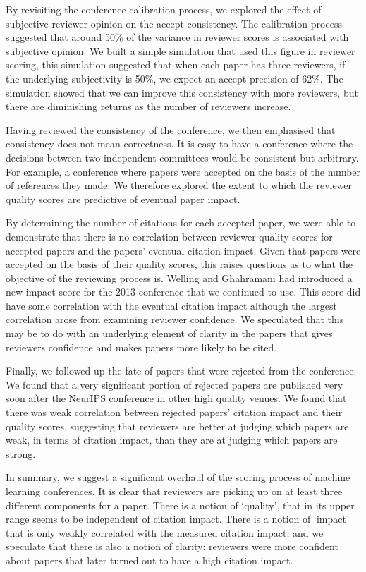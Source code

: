 \documentclass[twoside]{article}
\begin{document}
By revisiting the conference calibration process, we explored the
effect of subjective reviewer opinion on the accept consistency. The
calibration process suggested that around 50\% of the variance in
reviewer scores is associated with subjective opinion. We built a
simple simulation that used this figure in reviewer scoring, this
simulation suggested that when each paper has three reviewers, if the
underlying subjectivity is 50\%, we expect an accept precision of
62\%. The simulation showed that we can improve this consistency with
more reviewers, but there are diminishing returns as the number of
reviewers increase.

Having reviewed the consistency of the conference, we then emphasised
that consistency does not mean correctness. It is easy to have a
conference where the decisions between two independent committees
would be consistent but arbitrary. For example, a conference where papers
were accepted on the basis of the number of references they made. We
therefore explored the extent to which the reviewer quality scores are
predictive of eventual paper impact.

By determining the number of citations for each accepted paper, we
were able to demonstrate that there is no correlation between reviewer
quality scores for accepted papers and the papers' eventual citation
impact. Given that papers were accepted on the basis of their quality
scores, this raises questions as to what the objective of the
reviewing process is. Welling and Ghahramani had introduced a new
impact score for the 2013 conference that we
continued to use. This score did have some correlation with the
eventual citation impact although the largest correlation arose from
examining reviewer confidence. We speculated that this may be to do
with an underlying element of clarity in the papers that gives
reviewers confidence and makes papers more likely to be cited.

Finally, we followed up the fate of papers that were rejected from the
conference. We found that a very significant portion of rejected
papers are published very soon after the NeurIPS conference in other
high quality venues. We found that there was weak correlation between rejected papers' citation impact and their quality scores, suggesting that
reviewers are better at judging which papers are weak, in terms of
citation impact, than they are at judging which papers are strong.

In summary, we suggest a significant overhaul of the scoring process
of machine learning conferences. It is clear that reviewers are
picking up on at least three different components for a paper. There
is a notion of `quality', that in its upper range seems to be
independent of citation impact. There is a notion of `impact' that is
only weakly correlated with the measured citation impact, and we
speculate that there is also a notion of clarity: reviewers were more
confident about papers that later turned out to have a high citation
impact.
\end{document}
